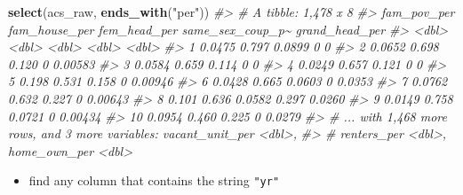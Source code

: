 \documentclass[
]{book}
\newenvironment{Shaded}{\begin{snugshade}}{\end{snugshade}}
\newcommand{\CommentTok}[1]{\textcolor[rgb]{0.56,0.35,0.01}{\textit{#1}}}
\newcommand{\KeywordTok}[1]{\textcolor[rgb]{0.13,0.29,0.53}{\textbf{#1}}}
\newcommand{\NormalTok}[1]{#1}
\newcommand{\StringTok}[1]{\textcolor[rgb]{0.31,0.60,0.02}{#1}}
\providecommand{\tightlist}{%
  \setlength{\itemsep}{0pt}\setlength{\parskip}{0pt}}
\begin{document}
\begin{Shaded}
\begin{Highlighting}[]
\KeywordTok{select}\NormalTok{(acs\_raw, }\KeywordTok{ends\_with}\NormalTok{(}\StringTok{"per"}\NormalTok{))}
\CommentTok{\#\textgreater{} \# A tibble: 1,478 x 8}
\CommentTok{\#\textgreater{}    fam\_pov\_per fam\_house\_per fem\_head\_per same\_sex\_coup\_p\textasciitilde{} grand\_head\_per}
\CommentTok{\#\textgreater{}          \textless{}dbl\textgreater{}         \textless{}dbl\textgreater{}        \textless{}dbl\textgreater{}            \textless{}dbl\textgreater{}          \textless{}dbl\textgreater{}}
\CommentTok{\#\textgreater{}  1      0.0475         0.797       0.0899            0            0      }
\CommentTok{\#\textgreater{}  2      0.0652         0.698       0.120             0            0.00583}
\CommentTok{\#\textgreater{}  3      0.0584         0.659       0.114             0            0      }
\CommentTok{\#\textgreater{}  4      0.0249         0.657       0.121             0            0      }
\CommentTok{\#\textgreater{}  5      0.198          0.531       0.158             0            0.00946}
\CommentTok{\#\textgreater{}  6      0.0428         0.665       0.0603            0            0.0353 }
\CommentTok{\#\textgreater{}  7      0.0762         0.632       0.227             0            0.00643}
\CommentTok{\#\textgreater{}  8      0.101          0.636       0.0582            0.297        0.0260 }
\CommentTok{\#\textgreater{}  9      0.0149         0.758       0.0721            0            0.00434}
\CommentTok{\#\textgreater{} 10      0.0954         0.460       0.225             0            0.0279 }
\CommentTok{\#\textgreater{} \# ... with 1,468 more rows, and 3 more variables: vacant\_unit\_per \textless{}dbl\textgreater{},}
\CommentTok{\#\textgreater{} \#   renters\_per \textless{}dbl\textgreater{}, home\_own\_per \textless{}dbl\textgreater{}}
\end{Highlighting}
\end{Shaded}

\begin{itemize}
\tightlist
\item
  find any column that contains the string \texttt{"yr"}
\end{itemize}
\end{document}
